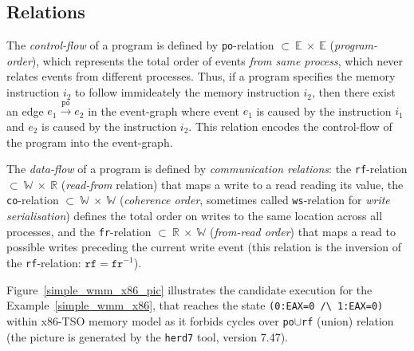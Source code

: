 \subsection{Relations}
\label{ch:wmm:model:relations}

The \textit{control-flow} of a program is defined by \texttt{po}-relation $\subset~\mathbb{E}~\times~\mathbb{E}$ (\textit{program-order}), which represents the total order of events \textit{from same process}, which never relates events from different processes.
Thus, if a program specifies the memory instruction $i_2$ to follow immideately the memory instruction $i_2$, then there exist an edge $e_1 \xrightarrow{\mathtt{po}} e_2$ in the event-graph where event $e_1$ is caused by the instruction $i_1$ and $e_2$ is caused by the instruction $i_2$. This relation encodes the control-flow of the program into the event-graph.

The \textit{data-flow} of a program is defined by \textit{communication relations}: the \texttt{rf}-relation $\subset~\mathbb{W}~\times~\mathbb{R}$ (\textit{read-from} relation) that maps a write to a read reading its value, the \texttt{co}-relation $\subset~\mathbb{W}~\times~\mathbb{W}$ (\textit{coherence order}, sometimes called \texttt{ws}-relation for \textit{write serialisation}) defines the total order on writes to the same location across all processes, and the \texttt{fr}-relation $\subset~\mathbb{R}~\times~\mathbb{W}$ (\textit{from-read order}) that maps a read to possible writes preceding the current write event (this relation is the inversion of the \texttt{rf}-relation: $\mathtt{rf} = \mathtt{fr}^{-1}$).

Figure~\ref{simple_wmm_x86_pic} illustrates the candidate execution for the Example~\ref{simple_wmm_x86}, that reaches the state \texttt{(0:EAX=0~/\textbackslash~1:EAX=0)} within x86-TSO memory model as it forbids cycles over \texttt{po}$\cup$\texttt{rf} (union) relation (the picture is generated by the \texttt{herd7} tool, version 7.47). 

